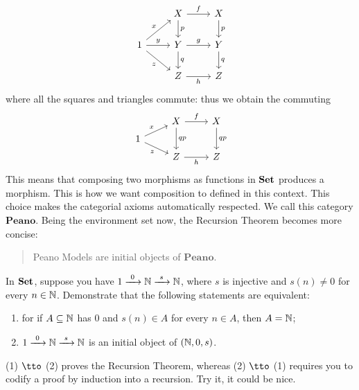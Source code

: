 \begin{example}[Recursion]
\[\begin{tikzcd}
& X \ar["f", r] \ar["p", d] & X \ar["p", d] \\
1 \ar["x", ur] \ar["y", r] \ar["z", dr, swap] & Y \ar["g", r] \ar["q", d] & Y \ar["q", d] \\
& Z \ar["h", r, swap] & Z
\end{tikzcd}\]
where all the squares and triangles commute: thus we obtain the commuting
\[\begin{tikzcd}[row sep=tiny]
& X \ar["f", r] \ar["qp", dd] & X \ar["qp", dd] \\
1 \ar["x", ur] \ar["z", dr, swap] \\
& Z \ar["h", r, swap] & Z
\end{tikzcd}\] This means that composing two morphisms as functions in \(\mathbf{Set}\) produces a morphism. This is how we want composition to defined in this context. This choice makes the categorial axioms automatically respected. We call this category \(\mathbf{Peano}\). \newline
Being the environment set now, the Recursion Theorem becomes more concise:
\begin{quotation}
Peano Models are initial objects of \(\mathbf{Peano}\). 
\end{quotation}
\end{example}

\begin{exercise}
In \(\mathbf{Set}\), suppose you have \(1 \xrightarrow{\ 0\ } \mathbb N \xrightarrow{\ s\ } \mathbb N\), where \(s\) is injective and \(s(n) \ne 0\) for every \(n \in \mathbb N\). Demonstrate that the following statements are equivalent:
\begin{enumerate}
\item for if \(A \subseteq \mathbb N\) has \(0\) and \(s(n) \in A\) for every \(n \in A\), then \(A = \mathbb N\);
\item \(1 \xrightarrow{\ 0\ } \mathbb N \xrightarrow{\ s\ } \mathbb N\) is an initial object of \((\mathbb N, 0, s)\).
\end{enumerate} 
(1) \(\tto\) (2) proves the Recursion Theorem, whereas (2) \(\tto\) (1) requires you to codify a proof by induction into a recursion. Try it, it could be nice.
\end{exercise}

